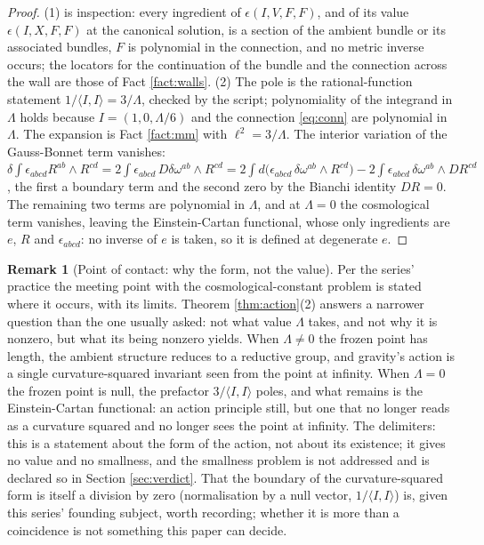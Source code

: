 \documentclass[11pt]{article}
\theoremstyle{definition}
\newtheorem{remark}[theorem]{Remark}
\newcommand{\ip}[2]{\langle #1, #2\rangle}
\begin{document}
\begin{proof}
(1) is inspection: every ingredient of $\epsilon(I, V, F, F)$, and of its value $\epsilon(I, X, F, F)$ at the canonical solution, is a section of the ambient bundle or its associated bundles, $F$ is polynomial in the connection, and no metric inverse occurs; the locators for the continuation of the bundle and the connection across the wall are those of Fact \ref{fact:walls}.
(2) The pole is the rational-function statement $1/\ip{I}{I} = 3/\Lambda$, checked by the script; polynomiality of the integrand in $\Lambda$ holds because $I = (1, 0, \Lambda/6)$ and the connection \eqref{eq:conn} are polynomial in $\Lambda$. The expansion is Fact \ref{fact:mm} with $\ell^2 = 3/\Lambda$. The interior variation of the Gauss-Bonnet term vanishes: $\delta\int\epsilon_{abcd}R^{ab}\wedge R^{cd} = 2\int\epsilon_{abcd}\,D\delta\omega^{ab}\wedge R^{cd} = 2\int d\bigl(\epsilon_{abcd}\,\delta\omega^{ab}\wedge R^{cd}\bigr) - 2\int \epsilon_{abcd}\,\delta\omega^{ab}\wedge DR^{cd}$, the first a boundary term and the second zero by the Bianchi identity $DR = 0$. The remaining two terms are polynomial in $\Lambda$, and at $\Lambda = 0$ the cosmological term vanishes, leaving the Einstein-Cartan functional, whose only ingredients are $e$, $R$ and $\epsilon_{abcd}$: no inverse of $e$ is taken, so it is defined at degenerate $e$.
\end{proof}

\begin{remark}[Point of contact: why the form, not the value]\label{rem:whynonzero}
Per the series' practice the meeting point with the cosmological-constant problem is stated where it occurs, with its limits. Theorem \ref{thm:action}(2) answers a narrower question than the one usually asked: not what value $\Lambda$ takes, and not why it is nonzero, but what its being nonzero yields. When $\Lambda \neq 0$ the frozen point has length, the ambient structure reduces to a reductive group, and gravity's action is a single curvature-squared invariant seen from the point at infinity. When $\Lambda = 0$ the frozen point is null, the prefactor $3/\ip{I}{I}$ poles, and what remains is the Einstein-Cartan functional: an action principle still, but one that no longer reads as a curvature squared and no longer sees the point at infinity. The delimiters: this is a statement about the form of the action, not about its existence; it gives no value and no smallness, and the smallness problem is not addressed and is declared so in Section \ref{sec:verdict}. That the boundary of the curvature-squared form is itself a division by zero (normalisation by a null vector, $1/\ip{I}{I}$) is, given this series' founding subject, worth recording; whether it is more than a coincidence is not something this paper can decide.
\end{remark}
\end{document}
